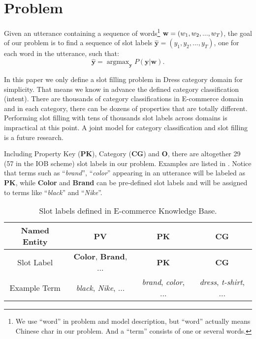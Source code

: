 \section{Problem}
\label{sec:problem}
Given an utterance containing a sequence of
words\footnote{We use ``word'' in problem and model description,
	but ``word'' actually means Chinese char in our problem.
And a ``term'' consists of one or several words.} 
$\textbf{w} = (w_1, w_2, ...,\\ w_T)$,
the goal of our problem
is to find a sequence of slot labels $\hat{\textbf{y}} = (y_1, y_2, ..., y_T)$, 
one for each word in the utterance, such that:
\begin{equation*}
	\hat{\textbf{y}} = \mathop{\arg\max}_{\textbf{y}}P(\textbf{y}|\textbf{w}).
\end{equation*}

In this paper we only define a slot filling problem in Dress category domain 
for simplicity.
That means we know in advance the defined category classification (intent).
There are thousands of category classifications in E-commerce domain
and in each category, there can be dozens of properties that 
are totally different.  Performing slot filling with tens of thousands 
slot labels across domains is impractical at this point.
A joint model for category classification and slot filling is 
a future research. 

Including Property Key (\textbf{PK}), Category (\textbf{CG}) and \textbf{O},
there are altogether 29 (57 in the IOB scheme) slot labels in our problem. 
Examples are listed in .
Notice that terms such as ``\emph{brand}'', ``\emph{color}''
appearing in an utterance
will be labeled as \textbf{PK},
while \textbf{Color} and \textbf{Brand} can be pre-defined slot labels
and will be assigned to terms like
``\emph{black}'' and ``\emph{Nike}''.
\begin{table}[htbp]
	\centering
	\small
	\caption{Slot labels defined in E-commerce Knowledge Base.}
	\begin{tabular}{c|c|c|c}
		\toprule
		Named Entity & PV & PK & CG \\
		\midrule
		Slot Label & \textbf{Color}, \textbf{Brand}, ... & \textbf{PK} & \textbf{CG} \\
		\midrule
		Example Term & \emph{black}, \emph{Nike}, ... & \emph{brand}, \emph{color}, ... & \emph{dress}, \emph{t-shirt}, ... \\
		\bottomrule
	\end{tabular}
	\label{slot-labels}
\end{table}


